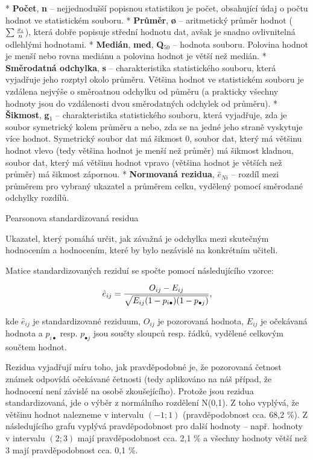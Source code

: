* {\bf Počet}, {\bf n} -- nejjednodušší popisnou statistikou je počet, obsahující údaj o počtu hodnot ve statistickém souboru.
* {\bf Průměr}, {\bf \o} -- aritmetický průměr hodnot ($\sum{x_i\over n}$), která dobře popisuje střední hodnotu dat, avšak je snadno ovlivnitelná odlehlými hodnotami.
* {\bf Medián}, {\bf med}, {\bf Q$_{50}$} --  hodnota souboru. Polovina hodnot je menší nebo rovna mediánu a polovina hodnot je větší než medián.
* {\bf Směrodatná odchylka}, {\bf s} -- charakteristika statistického souboru, která vyjadřuje jeho rozptyl okolo průměru. Většina hodnot ve statistickém souboru je vzdálena nejvýše o směroatnou odchylku od půměru (a prakticky všechny hodnoty jsou do vzdálenosti dvou směrodatných odchylek od průměru).
* {\bf Šikmost}, {\bf g${}_1$} -- charakteristika statistického souboru, která vyjadřuje, zda je soubor symetrický kolem průměru a nebo, zda se na jedné jeho straně vyskytuje více hodnot. Symetrický
soubor dat má šikmost 0, soubor dat, který má většinu hodnot vlevo (tedy většina hodnot je menší než průměr) má šikmost kladnou, soubor dat, který má většinu hodnot vpravo (většina hodnot je větších než průměr) má šikmost zápornou. 
* {\bf Normovaná rezidua}, {\bf $\hat{e}_{Ni}$} -- rozdíl mezi průměrem pro vybraný ukazatel a průměrem celku, vydělený pomocí směrodané odchylky rozdílů.
\enditems

\notoc\sec Pearsonova standardizovaná residua

Ukazatel, který pomáhá určit, jak závažná je odchylka mezi skutečným hodnocením a hodnocením, které by bylo nezávislé na konkrétním učiteli.

Matice standardizovaných reziduí se spočte pomocí následujícího vzorce:

$$\hat{e}_{ij} = {O_{ij} - E_{ij}\over \sqrt{E_{ij}(1-p_{i\bullet})(1-p_{\bullet j})}},$$

kde $\hat{e}_{ij}$ je standardizované reziduum, $O_{ij}$ je pozorovaná hodnota, $E_{ij}$ je očekávaná hodnota a $p_{i\bullet}$ resp. $p_{\bullet j}$ jsou součty sloupců resp. řádků, vydělené celkovým součtem hodnot.

Rezidua vyjadřují míru toho, jak pravděpodobné je, že pozorovaná četnost známek odpovídá očekávané četnosti (tedy aplikováno na náš případ, že hodnocení není závislé na osobě zkoušejícího). Protože jsou rezidua standardizovaná, jde o výběr z normálního rozdělení N(0,1). Z toho vyplývá, že většinu hodnot nalezneme v intervalu $(-1;1)$ (pravděpodobnost cca. 68,2 \%). Z následujícího grafu vyplývá pravděpodobnost pro další hodnoty -- např. hodnoty v intervalu $(2;3)$ mají pravděpodobnost cca. 2,1 \% a všechny hodnoty větší než $3$ mají pravděpodobnost cca. 0,1 \%.

